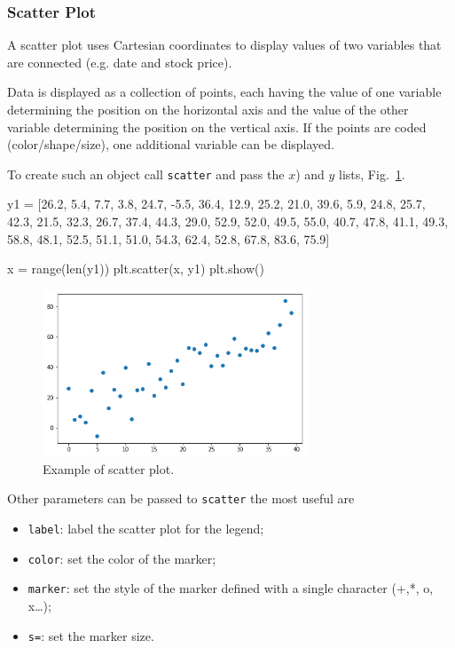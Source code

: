 \subsubsection{Scatter Plot}
\label{scatter}

A scatter plot uses Cartesian coordinates to display values of two variables that are connected (e.g. date and stock price). 

Data is displayed as a collection of points, each having the value of one variable determining the position on the horizontal axis and the value of the other variable determining the position on the vertical axis. If the points are coded (color/shape/size), one additional variable can be displayed.

To create such an object call \texttt{scatter} and pass the $x$) and $y$ lists, Fig.~\ref{fig:scatter1}.

\begin{ipython}
y1 = [26.2, 5.4, 7.7, 3.8, 24.7, -5.5, 36.4, 12.9, 25.2, 21.0, 39.6,
      5.9, 24.8, 25.7, 42.3, 21.5, 32.3, 26.7, 37.4, 44.3, 29.0,
      52.9, 52.0, 49.5, 55.0, 40.7, 47.8, 41.1, 49.3, 58.8, 48.1,
      52.5, 51.1, 51.0, 54.3, 62.4, 52.8, 67.8, 83.6, 75.9]

x = range(len(y1))
plt.scatter(x, y1)
plt.show()
\end{ipython}

\begin{figure}[htb]
	\centering
	\includegraphics[width=0.7\textwidth]{figures/scatter}
	\caption{Example of scatter plot.}
	\label{fig:scatter1}
\end{figure}

Other parameters can be passed to \texttt{scatter} the most useful are

\begin{itemize}
\tightlist
\item \texttt{label}: label the scatter plot for the legend;
\item \texttt{color}: set the color of the marker;
\item \texttt{marker}: set the style of the marker defined with a single character (+,*, o, x\ldots{});
\item \texttt{s=}: set the marker size.
\end{itemize}

